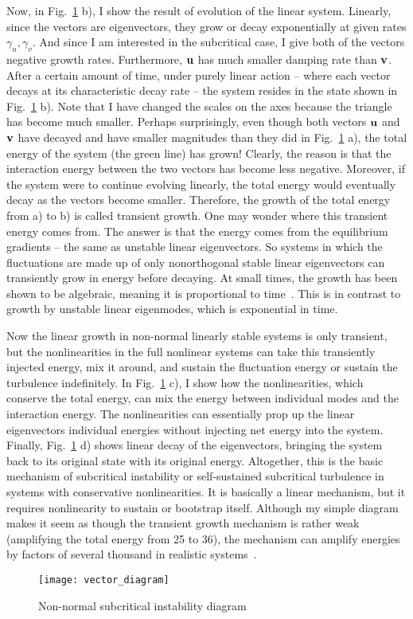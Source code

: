 Now, in Fig.~\ref{vector_diagram} b), I show the result of evolution of the linear system. Linearly, since the vectors are eigenvectors, 
they grow or decay exponentially at given rates $\gamma_u, \gamma_v$. And since I am
interested in the subcritical case, I give both of the vectors negative growth rates. Furthermore, ${\bf u}$ has much smaller damping rate than ${\bf v}$. After a certain amount of time, under
purely linear action -- where each vector decays at its characteristic decay rate -- the system resides in the state shown in Fig.~\ref{vector_diagram} b). Note that I have changed the scales on
the axes because the triangle has become much smaller. Perhaps surprisingly, even though both vectors ${\bf u}$ and ${\bf v}$ have decayed and have smaller magnitudes than they did in 
Fig.~\ref{vector_diagram} a), the total energy of the system (the green line) has grown! Clearly, the reason is that the interaction energy between the two vectors has become less negative.
Moreover, if the system were to continue evolving linearly, the total energy would eventually decay as the vectors become smaller. Therefore, the growth of the total energy from a) to b)
is called transient growth. One may wonder where this transient energy comes from. The answer is that the energy comes from the equilibrium gradients -- the same as unstable linear eigenvectors.
So systems in which the fluctuations are made up of only nonorthogonal stable linear eigenvectors can transiently grow in energy before decaying. At small times, the growth has been shown to be
algebraic, meaning it is proportional to time~\cite{waleffe1995}. This is in contrast to growth by unstable linear eigenmodes, which is exponential in time.

Now the linear growth in non-normal linearly stable systems is only transient, but the nonlinearities in the full nonlinear systems can take this transiently injected energy, mix it around,
and sustain the fluctuation energy or sustain the turbulence indefinitely. In Fig.~\ref{vector_diagram} c), I show how the nonlinearities, which conserve the total energy, can mix the energy
between individual modes and the interaction energy. The nonlinearities can essentially prop up the linear eigenvectors individual energies without injecting net energy into the system.
Finally, Fig.~\ref{vector_diagram} d) shows linear decay of the eigenvectors, bringing the system back to its original state with its original energy. Altogether, this is the basic
mechanism of subcritical instability or self-sustained subcritical turbulence in systems with conservative nonlinearities. It is basically a linear mechanism, but it requires nonlinearity to
sustain or bootstrap itself.
Although my simple diagram makes it seem as though the transient growth mechanism is rather weak
(amplifying the total energy from 25 to 36), the mechanism can amplify energies by factors of several thousand in realistic systems~\cite{gustavsson1991,butler1992}.

\begin{figure}[!ht]
\centerline{\texttt{[image: vector\_diagram]}}
\caption{Non-normal subcritical instability diagram}
\label{vector_diagram}
\end{figure}
